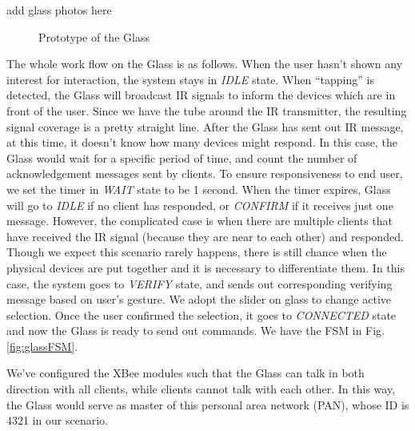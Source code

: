 {\color{red} add glass photos here}
\begin{figure}
  \centering
  \caption{Prototype of the Glass}
  \label{fig:glass}
\end{figure}


The whole work flow on the Glass is as follows. When the user hasn't shown any interest for interaction, the system stays in {\it IDLE} state. When ``tapping'' is detected, the Glass will broadcast IR signals to inform the devices which are in front of the user. Since we have the tube around the IR transmitter, the resulting signal coverage is a pretty straight line. After the Glass has sent out IR message, at this time, it doesn't know how many devices might respond. In this case, the Glass would wait for a specific period of time, and count the number of acknowledgement messages sent by clients. To ensure responsiveness to end user, we set the timer in {\it WAIT} state to be 1 second. When the timer expires, Glass will go to {\it IDLE} if no client has responded, or {\it CONFIRM} if it receives just one message. However, the complicated case is when there are multiple clients that have received the IR signal (because they are near to each other) and responded. Though we expect this scenario rarely happens, there is still chance when the physical devices are put together and it is necessary to differentiate them. In this case, the system goes to {\it VERIFY} state, and sends out corresponding verifying message based on user's gesture. We adopt the slider on glass to change active selection. Once the user confirmed the selection, it goes to {\it CONNECTED} state and now the Glass is ready to send out commands. We have the FSM in Fig.\,\ref{fig:glassFSM}.

We've configured the XBee modules such that the Glass can talk in both direction with all clients, while clients cannot talk with each other. In this way, the Glass would serve as master of this personal area network (PAN), whose ID is 4321 in our scenario. 

